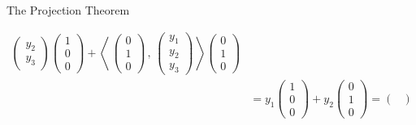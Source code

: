 \documentclass[smaller,hyperref={CJKbookmarks=true}]{beamer}
\newcommand{\scp}[2]{\left\langle\,#1\,,\,#2\,\right\rangle} \newcommand{\scpp}{\langle\,\cdot\,,\,\cdot\,\rangle}
\begin{document}
\begin{frame}{The Projection Theorem}
\begin{spacing}{1}
\begin{align*}
{\begin{pmatrix}
                           y_2 \\
                           y_3
                         \end{pmatrix}}\begin{pmatrix}
                                         1 \\
                                         0 \\
                                         0
                                       \end{pmatrix}+\scp{\begin{pmatrix}
                                                            0 \\
                                                            1 \\
                                                            0
                                                          \end{pmatrix}}{\begin{pmatrix}
                                                                           y_1 \\
                                                                           y_2 \\
                                                                           y_3
                                                                         \end{pmatrix}}\begin{pmatrix}
                                                                                         0 \\
                                                                                         1 \\
                                                                                         0
                                                                                       \end{pmatrix}  \\
   &=y_1\begin{pmatrix}
          1 \\
          0 \\
          0
        \end{pmatrix}+y_2\begin{pmatrix}
                           0 \\
                           1 \\
                           0
                         \end{pmatrix}=\begin{pmatrix}

\end{pmatrix}
\end{align*}
\end{spacing}
\end{frame}
\end{document}
